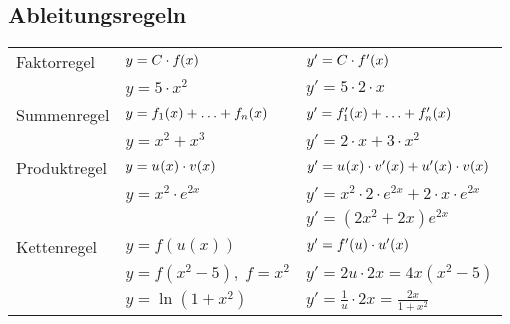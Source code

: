 \documentclass[
	final,
	a4paper,
	oneside,
	parskip=full,
	headings=standardclasses,
	headings=big,
	pointednumbers,
    fleqn
]{scrartcl}
\newcommand{\kl}[1]{{\left( #1 \right)}}
\begin{document}
    \subsection*{Ableitungsregeln}
    
    \renewcommand{\arraystretch}{1.25}
    \begin{tabular}{lll}
        Faktorregel  & $ y = C \cdot \fx$                   & $ y' = C \cdot \dfx $ \\
                     & $ y = 5 \cdot x^2 $                  & $ y' = 5 \cdot 2 \cdot x$ \\
        Summenregel  & $ y = \fx[1] + \ldots +  \fx[n] $    & $ y' = \dfx[1] + \ldots + \dfx[n] $\\
                     & $ y = x^2 + x^3$                     & $ y' = 2 \cdot x + 3 \cdot x^2$ \\
        Produktregel & $ y = \fx[][u] \cdot \fx[][v] $      & $ y' = \fx[][u] \cdot \dfx[][v] + \dfx[][u] \cdot \fx[][v] $ \\
                     & $ y = x^2 \cdot e^{2x}  $            & $ y' = x^2 \cdot 2\cdot e^{2x} + 2\cdot x \cdot e^{2x} $ \\
                     &                                      & $ y' = {\left( 2x^2 + 2x \right)} e^{2x} $ \\
        Kettenregel  & $ y = f\kl{u\kl{x}} $                & $ y' = \dfx[][f][u] \cdot \dfx[][u][x] $ \\
                     & $ y = f\kl{x^2 - 5}, \; f = x^2 $    & $ y' = 2 u \cdot 2x = 4x \kl{x^2 - 5} $ \\
                     & $ y = \ln\kl{1 + x^2} $              & $ y' = \frac{1}{u} \cdot 2x = \frac{2x}{1 + x^2} $ \\
    \end{tabular} \\
\end{document}

